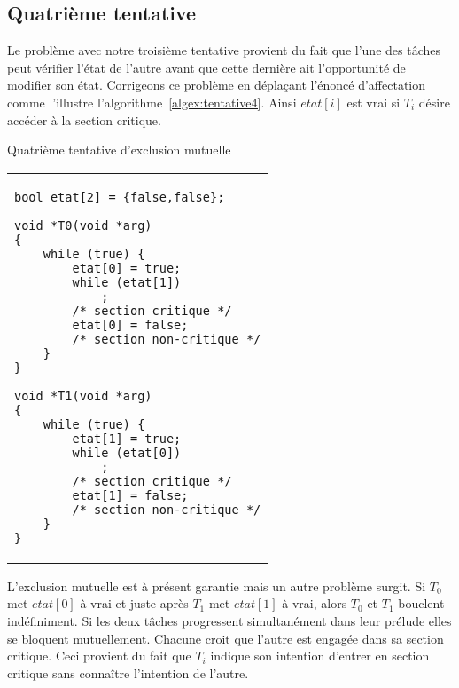\subsection*{Quatrième tentative}
Le problème avec notre troisième tentative provient du fait que l'une des tâches peut vérifier l'état de l'autre avant que cette dernière ait l'opportunité de modifier son état.  Corrigeons ce problème en déplaçant l'énoncé d'affectation comme l'illustre l'algorithme~\ref{algex:tentative4}.
Ainsi $etat[i]$ est vrai si $T_i$ désire accéder à la section critique.
\begin{algorithm}[!ht]
\caption{Quatrième tentative d'exclusion mutuelle}\label{algex:tentative4}
\begin{center}
\begin{tabular}{l}
\lstset{language=C++}
\begin{lstlisting}
bool etat[2] = {false,false};

void *T0(void *arg)
{
	while (true) {
		etat[0] = true;
		while (etat[1])
			;
		/* section critique */
		etat[0] = false;
		/* section non-critique */
	}
}

void *T1(void *arg)
{
	while (true) {
		etat[1] = true;
		while (etat[0])
			;
		/* section critique */
		etat[1] = false;
		/* section non-critique */
	}
}
\end{lstlisting}
\end{tabular}
\end{center}
\end{algorithm}

L'exclusion mutuelle est à présent garantie mais un autre problème surgit.
Si $T_0$ met $etat[0]$ à vrai et juste après $T_1$ met $etat[1]$ à vrai, alors $T_0$ et $T_1$ bouclent indéfiniment.
Si les deux tâches progressent simultanément dans leur prélude elles se bloquent mutuellement.
Chacune croit que l'autre est engagée dans sa section critique.
Ceci provient du fait que $T_i$ indique son intention d'entrer en section critique sans connaître l'intention de l'autre.

